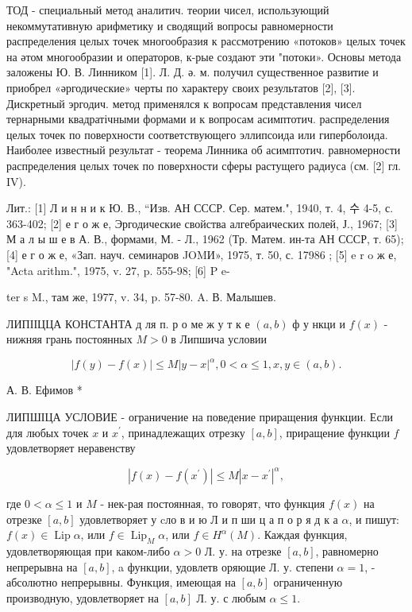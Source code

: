 \documentclass[10pt]{article}
\begin{document}
ТОД - специальный метод аналитич. теории чисел, использующий некоммутативную арифметику и сводящий вопросы равномерности распределения целых точек многообразия к рассмотрению «потоков» целых точек на әтом многообразии и операторов, к-рые создают эти "потоки». Основы метода заложены Ю. В. Линником [1]. Л. Д. ә. м. получил существенное развитие и приобрел «әргодические» черты по характеру своих результатов [2], [3]. Дискретный эргодич. метод применялся к вопросам представления чисел тернарными квадратічными формами и к вопросам асимптотич. распределения целых точек по поверхности соответствующего эллипсоида или гиперболоида. Наиболее известный результат - теорема Линника об асимптотич. равномерности распределения целых точек по поверхности сферы растущего радиуса (см. [2] гл. IV).



Лит.: [1] Л и н н и к Ю. В., “Изв. АН СССР. Сер. матем.", 1940, т. 4, 수 4-5, с. 363-402; [2] е г о ж е, Эргодические свойства алгебраических полей, Ј., 1967; [3] М а л ы ш е в А. В., формами, М. - Л., 1962 (Тр. Матем. ин-та АН СССР, т. 65); [4] е г о ж е, «Зап. науч. семинаров JOMИ», 1975, т. 50, с. 17986 ; [5] e r o ж е, "Acta arithm.", 1975, v. 27, p. 555-98; [6] P e-

ter s M., там же, 1977, v. 34, p. 57-80. A. В. Малышев.



ЛИПІІЦЦА КОНСТАНТА д ля п. р о ме ж у т к е $(a, b)$ ф у нкци и $f(x)$ - нижняя грань постоянных $M>0$ в Липшича условии



\[

|f(y)-f(x)| \leqslant M|y-x|^{\alpha}, 0<\alpha \leqslant 1, x, y \in(a, b) .

\]



А. В. Ефимов *



ЛИПШІЦА УСЛОВИЕ - ограничение на поведение приращения функции. Если для любых точек $x$ и $x^{\prime}$, принадлежащих отрезку $[a, b]$, приращение функции $f$ удовлетворяет неравенству



\[

\left|f(x)-f\left(x^{\prime}\right)\right| \leqslant M\left|x-x^{\prime}\right|^{\alpha},

\]



где $0<\alpha \leqslant 1$ и $M$ - нек-рая постоянная, то говорят, что функция $f(x)$ на отрезке $[a, b]$ удовлетворяет у cло в и ю Л и п ши ц а п о р я д к а $\alpha$, и пишут: $f(x) \in \operatorname{Lip} \alpha$, или $f \in \operatorname{Lip}_{M} \alpha$, или $f \in H^{\alpha}(M)$. Каждая функция, удовлетворяющая при каком-либо $\alpha>0$ Л. у. на отрезке $[a, b]$, равномерно непрерывна на $[a, b]$, a функции, удовлетв оряющие Л. у. степени $\alpha=1$, - абсолютно непрерывны. Функция, имеющая на $[a, b]$ ограниченную производную, удовлетворяет на $[a, b]$ Л. у. с любым $\alpha \leqslant 1$.
\end{document}
